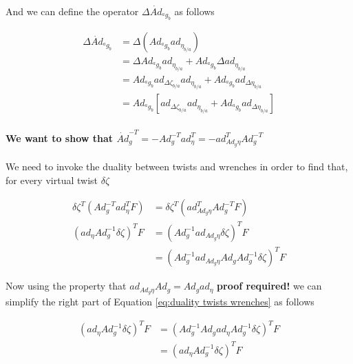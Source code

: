 \documentclass[12pt,a4paper]{book}
\newcommand{\agb}{\ensuremath{{^a g _b}}}
\newcommand{\etaba}{\ensuremath{{\eta_{b/a}}}}
\newcommand{\Adagb}{\ensuremath{Ad_{\agb}}}
\newcommand{\dotAdagb}{\ensuremath{\dot{Ad}_{\agb}}}
\newcommand{\adetaba}{\ensuremath{ad_{\etaba}}}
\newcommand{\Dzetaba}{\ensuremath{{\Delta \zeta_{b/a}}}}
\newcommand{\adDzetaba}{\ensuremath{ad_{\Dzetaba}}}
\begin{document}
And we can define the operator $\Delta \dotAdagb$  as follows

\begin{equation}
\begin{aligned}
	\Delta \dotAdagb 	&= \Delta  \left( \Adagb \adetaba \right)  \\
		&=  \Delta \Adagb \adetaba +  \Adagb \Delta \adetaba \\
		&= \Adagb \adDzetaba \adetaba + \Adagb ad_{\Delta \etaba} \\
		&= \Adagb \left[ \adDzetaba \adetaba + \Adagb ad_{\Delta \etaba} \right]
\end{aligned}
\end{equation}



\paragraph{We want to show that $\dot{Ad}_g^{-T} = - Ad_g^{-T} ad_\eta ^T = - ad^T _{Ad_g \eta} Ad_g ^{-T}$}

We need to invoke the duality between twists and wrenches in order to find that, for every virtual twist $\delta \zeta$

\begin{equation}\label{eq:duality twists wrenches}
\begin{aligned}
	\delta \zeta ^T \left( Ad_g^{-T} ad_\eta^T F  \right) &= \delta \zeta ^T \left( ad_{Ad_g \eta}^TAd_g^{-T} F  \right) \\
	\left(  ad_\eta Ad_g^{-1} \delta \zeta  \right)^T F &= \left( Ad_g^{-1} ad_{Ad_g \eta}  \delta \zeta  \right)^T F \\
	&= \left( Ad_g^{-1} ad_{Ad_g \eta}  Ad_g Ad_g ^{-1}\delta \zeta  \right)^T F
\end{aligned}
\end{equation}

Now using the property that $ad_{Ad_g \eta}  Ad_g = Ad_g ad_{ \eta}$ \color{red} \textbf{proof required!}\color{black} we can simplify the right part of Equation \eqref{eq:duality twists wrenches} as follows

\begin{equation}\label{eq:duality twists wrenches simplified}
\begin{aligned}
	\left(  ad_\eta Ad_g^{-1} \delta \zeta  \right)^T F &= \left( Ad_g^{-1} Ad_g ad_{ \eta} Ad_g ^{-1}\delta \zeta  \right)^T F \\
	&= \left( ad_{ \eta} Ad_g ^{-1}\delta \zeta  \right)^T F
\end{aligned}
\end{equation}
\end{document}
